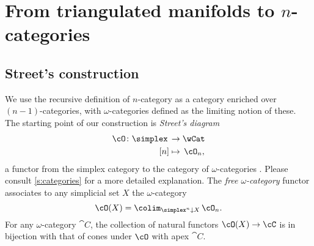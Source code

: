 \section{From triangulated manifolds to $n$-categories}

\subsection{Street's construction}

We use the recursive definition of $n$-category as a category enriched over $(n-1)$-categories, with $\omega$-categories defined as the limiting notion of these.
The starting point of our construction is \textit{Street's diagram}
\[
\begin{split}
	\cO \colon \simplex \, &\to \wCat \\
	[n] &\mapsto \, \cO_n,
\end{split}
\]
a functor from the simplex category to the category of $\omega$-categories \cite{street1987orientals}.
Please consult \cref{s:categories} for a more detailed explanation.
The \textit{free $\omega$-category} functor associates to any simplicial set $X$ the $\omega$-category
\[
\cO(X) = \colim_{\simplex^n \downarrow X} \, \cO_n.
\]
For any $\omega$-category $\cat{C}$, the collection of natural functors $\cO(X) \to \cC$ is in bijection with that of cones under $\cO$ with apex $\cat{C}$.

